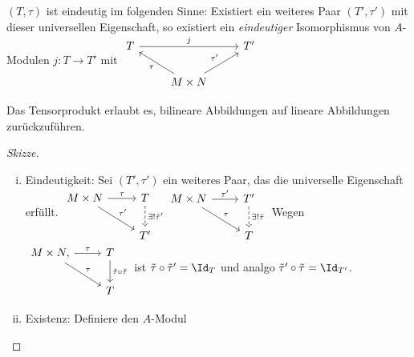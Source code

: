 \begin{st}
    $(T, \tau)$ ist eindeutig im folgenden Sinne: Existiert ein weiteres Paar $(T', \tau')$ mit dieser universellen Eigenschaft, so existiert ein \emph{eindeutiger} Isomorphismus von $A$-Modulen $j: T \to T'$ mit
    \begin{math}
        \begin{tikzcd}
            T \ar[rr,"j"] && T' \\
            & M \times N \ar[ul,"\tau"] \ar[ur,"\tau'"]
        \end{tikzcd}
    \end{math}
    \begin{note}
        Das Tensorprodukt erlaubt es, bilineare Abbildungen auf lineare Abbildungen zurückzuführen.
    \end{note}
    \begin{proof}[Skizze]
        \begin{enumerate}[(i)]
            \item
                Eindeutigkeit:
                Sei $(T', \tau')$ ein weiteres Paar, das die universelle Eigenschaft erfüllt.
                \begin{math}
                    \begin{tikzcd}
                        M \times N \ar[r,"\tau"] \ar[rd,"\tau'"] & T \ar[d,dashed,"\exists! \tilde \tau'"] \\
                        & T'
                    \end{tikzcd}
                    \begin{tikzcd}
                        M \times N \ar[r,"\tau'"] \ar[rd,"\tau"] & T' \ar[d,dashed,"\exists! \tilde \tau"] \\
                        & T
                    \end{tikzcd}
                \end{math}
                Wegen
                \begin{math}
                    \begin{tikzcd}
                        M \times N \ar[r,"\tau"], \ar[dr,"\tau"] & T \ar[d,"\tilde \tau \circ \tilde \tau"] \\
                        & T
                    \end{tikzcd}
                \end{math}
                ist $\tilde \tau \circ \tilde \tau' = \Id_T$ und analgo $\tilde \tau' \circ \tilde \tau = \Id_{T'}$.
            \item
                Existenz:
                Definiere den $A$-Modul

\end{enumerate}
\end{proof}
\end{st}
